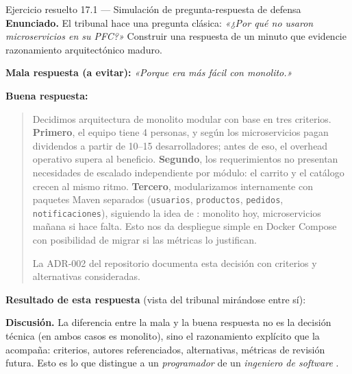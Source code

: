 \documentclass[11pt,a4paper,openany]{book}
\begin{document}
\begin{cajaejemplo}{Ejercicio resuelto 17.1 --- Simulación de pregunta-respuesta de defensa}
\textbf{Enunciado.} El tribunal hace una pregunta clásica:
\emph{«¿Por qué no usaron microservicios en su PFC?»} Construir una
respuesta de un minuto que evidencie razonamiento arquitectónico
maduro.

\textbf{Mala respuesta (a evitar):} \emph{«Porque era más fácil con
monolito.»}

\textbf{Buena respuesta:}
\begin{quote}
\small Decidimos arquitectura de monolito modular con base en tres
criterios. \textbf{Primero}, el equipo tiene 4 personas, y según
\cite{newman2019monolith} los microservicios pagan dividendos a
partir de 10--15 desarrolladores; antes de eso, el overhead operativo
supera al beneficio. \textbf{Segundo}, los requerimientos no presentan
necesidades de escalado independiente por módulo: el carrito y el
catálogo crecen al mismo ritmo. \textbf{Tercero}, modularizamos
internamente con paquetes Maven separados
(\texttt{usuarios}, \texttt{productos}, \texttt{pedidos},
\texttt{notificaciones}), siguiendo la idea de
\cite{auer2021monolithic}: monolito hoy, microservicios mañana si
hace falta. Esto nos da despliegue simple en Docker Compose con
posibilidad de migrar si las métricas lo justifican.

La ADR-002 del repositorio documenta esta decisión con criterios y
alternativas consideradas.
\end{quote}

\textbf{Resultado de esta respuesta} (vista del tribunal mirándose
entre sí):

\begin{center}
\end{center}

\textbf{Discusión.} La diferencia entre la mala y la buena respuesta
no es la decisión técnica (en ambos casos es monolito), sino el
razonamiento explícito que la acompaña: criterios, autores
referenciados, alternativas, métricas de revisión futura. Esto es lo
que distingue a un \emph{programador} de un \emph{ingeniero de
software} \cite{martin2017clean}.
\end{cajaejemplo}
\end{document}
